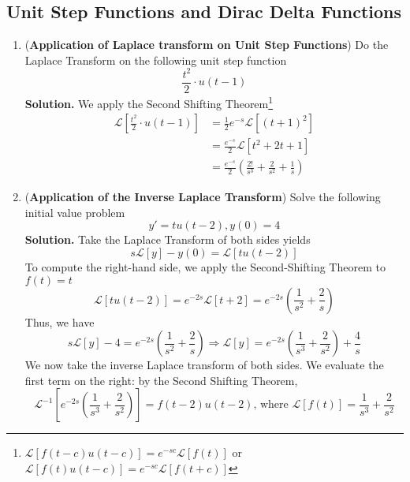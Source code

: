 \documentclass[a4paper]{article}
\begin{document}
\subsection{Unit Step Functions and Dirac Delta Functions}
\begin{enumerate}
    \item (\textbf{Application of Laplace transform on Unit Step Functions}) Do the Laplace Transform on the following unit step function
    \begin{equation}
        \frac{t^2}{2}\cdot u(t-1)
    \end{equation}
    \textbf{Solution.} We apply the Second Shifting Theorem\footnote{$\mathcal{L}[f(t-c)u(t-c)]=e^{-sc}\mathcal{L}[f(t)]$ or $\mathcal{L}[f(t)u(t-c)]=e^{-sc}\mathcal{L}[f(t+c)]$}
    \begin{align*}
        \mathcal{L}[\frac{t^2}{2}\cdot u(t-1)]&=\frac{1}{2}e^{-s}\mathcal{L}[(t+1)^2]\\
        &=\frac{e^{-s}}{2}\mathcal{L}[t^2+2t+1]\\
        &=\frac{e^{-s}}{2}(\frac{2!}{s^3}+\frac{2}{s^2}+\frac{1}{s})
    \end{align*}
    \item (\textbf{Application of the Inverse Laplace Transform}) Solve the following initial value problem
    \begin{equation}
        y'=tu(t-2),y(0)=4
    \end{equation}
    \textbf{Solution.} Take the Laplace Transform of both sides yields
    \begin{equation*}
        s\mathcal{L}[y]-y(0)=\mathcal{L}[tu(t-2)]
    \end{equation*}
    To compute the right-hand side, we apply the Second-Shifting Theorem to $f(t)=t$
    \begin{equation*}
        \mathcal{L}[tu(t-2)]=e^{-2s}\mathcal{L}[t+2]=e^{-2s}(\frac{1}{s^2}+\frac{2}{s})
    \end{equation*}
    Thus, we have
    \begin{equation*}
        s\mathcal{L}[y]-4=e^{-2s}(\frac{1}{s^2}+\frac{2}{s})\Rightarrow \mathcal{L}[y]=e^{-2s}(\frac{1}{s^3}+\frac{2}{s^2})+\frac{4}{s}
    \end{equation*}
    We now take the inverse Laplace transform of both sides. We evaluate the first term on the right: by the Second Shifting Theorem,
    \begin{equation*}
        \mathcal{L}^{-1}[e^{-2s}(\frac{1}{s^3}+\frac{2}{s^2})]=f(t-2)u(t-2)\text{, where }\mathcal{L}[f(t)]=\frac{1}{s^3}+\frac{2}{s^2}

\end{equation*}
\end{enumerate}
\end{document}
